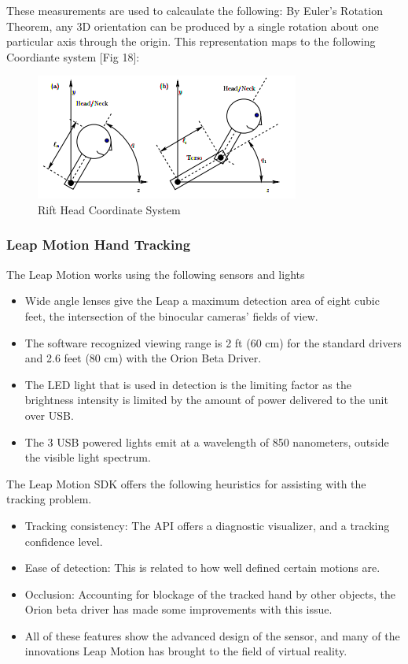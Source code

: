\documentclass[a4paper,10pt]{article}
\begin{document}
These measurements are used to calcaulate the following:
By Euler’s Rotation Theorem, any 3D orientation can
be produced by a single rotation about one particular axis
through the origin. This representation maps to the following Coordiante system [Fig 18]:
 \begin{figure}[H]
	\centerline{\includegraphics[scale=0.7]{riftHead.png}}
	\caption{Rift Head Coordinate System}
	\label{fig:magnets2}
	\end{figure}
 \pagebreak
\subsubsection{Leap Motion Hand Tracking}
The Leap Motion works using the following sensors and lights \cite{leapProc}
\begin{itemize}
 \item Wide angle lenses give the Leap a maximum detection area of eight cubic feet, the intersection of the binocular cameras’ fields of view. 
 \item The software recognized viewing range is 2 ft (60 cm) for the standard drivers and 2.6 feet (80 cm) with the Orion Beta Driver. 
 \item The LED light that is used in detection is the limiting factor as the brightness intensity is limited by the amount of power delivered to the unit
 over USB.
 \item The 3 USB powered lights emit at a wavelength of 850 nanometers, outside the visible light spectrum.
\end{itemize}

The Leap Motion SDK offers the following heuristics for assisting with the tracking problem.\cite{leapHeuristics}
\begin{itemize}
 \item Tracking consistency:  The API offers a diagnostic visualizer, and a tracking confidence level.
 \item Ease of detection: This is related to how well defined certain motions are. 
 \item Occlusion: Accounting for blockage of the tracked hand by other objects, the Orion beta driver has made some improvements with this issue.
 \item All of these features show the advanced design of the sensor, and many of the innovations Leap Motion has brought to the field of virtual reality. 
\end{itemize}
\end{document}
